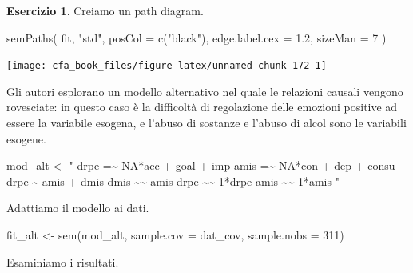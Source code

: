 \documentclass[
  11pt,
]{krantz}
\makeatletter
\newenvironment{Shaded}{\begin{snugshade}}{\end{snugshade}}
\newcommand{\AttributeTok}[1]{\textcolor[rgb]{0.61,0.61,0.61}{#1}}
\newcommand{\DecValTok}[1]{\textcolor[rgb]{0.06,0.06,0.06}{#1}}
\newcommand{\FloatTok}[1]{\textcolor[rgb]{0.06,0.06,0.06}{#1}}
\newcommand{\FunctionTok}[1]{\textcolor[rgb]{0,0,0}{#1}}
\newcommand{\NormalTok}[1]{#1}
\newcommand{\OtherTok}[1]{\textcolor[rgb]{0.37,0.37,0.37}{#1}}
\newcommand{\StringTok}[1]{\textcolor[rgb]{0.5,0.5,0.5}{#1}}
\newenvironment{kframe}{%
\medskip{}
\setlength{\fboxsep}{.8em}
 \def\at@end@of@kframe{}%
 \ifinner\ifhmode%
  \def\at@end@of@kframe{\end{minipage}}%
  \begin{minipage}{\columnwidth}%
 \fi\fi%
 \def\FrameCommand##1{\hskip\@totalleftmargin \hskip-\fboxsep
 \colorbox{shadecolor}{##1}\hskip-\fboxsep
     \hskip-\linewidth \hskip-\@totalleftmargin \hskip\columnwidth}%
 \MakeFramed {\advance\hsize-\width
   \@totalleftmargin\z@ \linewidth\hsize
   \@setminipage}}%
 {\par\unskip\endMakeFramed%
 \at@end@of@kframe}
\renewenvironment{Shaded}{\begin{kframe}}{\end{kframe}}
\theoremstyle{definition}
\theoremstyle{definition}
\theoremstyle{definition}
\newtheorem{exercise}{Esercizio}[chapter]
\theoremstyle{definition}
\theoremstyle{remark}
\makeatother
\begin{document}
\begin{exercise}
Creiamo un path diagram.

\begin{Shaded}
\begin{Highlighting}[]
\FunctionTok{semPaths}\NormalTok{(}
\NormalTok{  fit,}
  \StringTok{"std"}\NormalTok{,}
  \AttributeTok{posCol =} \FunctionTok{c}\NormalTok{(}\StringTok{"black"}\NormalTok{),}
  \AttributeTok{edge.label.cex =} \FloatTok{1.2}\NormalTok{,}
  \AttributeTok{sizeMan =} \DecValTok{7}
\NormalTok{)}
\end{Highlighting}
\end{Shaded}

\begin{center}\texttt{[image: cfa\_book\_files/figure-latex/unnamed-chunk-172-1]} \end{center}

Gli autori esplorano un modello alternativo nel quale le relazioni causali vengono rovesciate: in questo caso è la difficoltà di regolazione delle emozioni positive ad essere la variabile esogena, e l'abuso di sostanze e l'abuso di alcol sono le variabili esogene.

\begin{Shaded}
\begin{Highlighting}[]
\NormalTok{mod\_alt }\OtherTok{\textless{}{-}} \StringTok{"}
\StringTok{  drpe =\textasciitilde{} NA*acc + goal + imp}
\StringTok{  amis =\textasciitilde{} NA*con + dep + consu}
\StringTok{  drpe \textasciitilde{} amis + dmis}
\StringTok{  dmis \textasciitilde{}\textasciitilde{} amis}
\StringTok{  drpe \textasciitilde{}\textasciitilde{} 1*drpe}
\StringTok{  amis \textasciitilde{}\textasciitilde{} 1*amis}
\StringTok{"}
\end{Highlighting}
\end{Shaded}

Adattiamo il modello ai dati.

\begin{Shaded}
\begin{Highlighting}[]
\NormalTok{fit\_alt }\OtherTok{\textless{}{-}} \FunctionTok{sem}\NormalTok{(mod\_alt, }\AttributeTok{sample.cov =}\NormalTok{ dat\_cov, }\AttributeTok{sample.nobs =} \DecValTok{311}\NormalTok{)}
\end{Highlighting}
\end{Shaded}

Esaminiamo i risultati.


\end{exercise}
\end{document}
